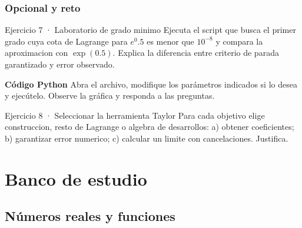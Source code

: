 \documentclass[10pt,a4paper,oneside,openany]{book}
\begin{document}
\section*{Opcional y reto}
\begin{PSevenOptional}{Ejercicio 7 · Laboratorio de grado minimo}
Ejecuta el script que busca el primer grado cuya cota de Lagrange para \(e^{0}.5\) es menor que \(10^{-8}\) y compara la aproximacion con \(\exp(0.5)\). Explica la diferencia entre criterio de parada garantizado y error observado.
\par\medskip\textbf{Código Python}
Abra el archivo, modifique los parámetros indicados si lo desea y
ejecútelo. Observe la gráfica y responda a las preguntas.\par\smallskip
{}
\end{PSevenOptional}
\begin{PSevenOptionalFixed}{Ejercicio 8 · Seleccionar la herramienta Taylor}
Para cada objetivo elige construccion, resto de Lagrange o algebra de desarrollos: a) obtener coeficientes; b) garantizar error numerico; c) calcular un limite con cancelaciones. Justifica.
\end{PSevenOptionalFixed}
\part{Banco de estudio}
\chapter{Números reales y funciones}
\end{document}
